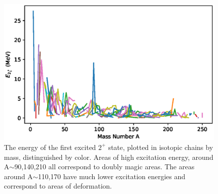 \begin{figure}[!]
    \centering
    \includegraphics[scale=0.9]{Introduction_Figs/E2vsA.eps}
    \caption{The energy of the first excited $2^+$ state, plotted in isotopic chains by mass, distinguished by color. Areas of high excitation energy, around A$\sim$90,140,210 all correspond to doubly magic areas. The areas around A$\sim$110,170 have much lower excitation energies and correspond to areas of deformation. }
    \label{fig:E2bymass}
\end{figure}